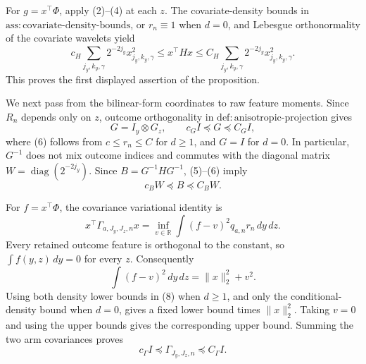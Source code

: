 For \(g=x^{\top}\Phi\), apply (2)--(4) at each \(z\).  The covariate-density bounds in \(\mathrm{ass{:}covariate\text{-}density\text{-}bounds}\), or \(r_n\equiv1\) when \(d=0\), and Lebesgue orthonormality of the covariate wavelets yield
\[
 c_H\sum_{j_y,k_y,\gamma}2^{-2j_y}x_{j_y,k_y,\gamma}^2
 \leq x^{\top}Hx
 \leq C_H\sum_{j_y,k_y,\gamma}2^{-2j_y}x_{j_y,k_y,\gamma}^2. \tag{5}
\]
This proves the first displayed assertion of the proposition.

We next pass from the bilinear-form coordinates to raw feature moments.  Since \(R_n\) depends only on \(z\), outcome orthogonality in \(\mathrm{def{:}anisotropic\text{-}projection}\) gives
\[
 G=I_y\otimes G_z,
 \qquad c_GI\preceq G\preceq C_GI, \tag{6}
\]
where (6) follows from \(c\leq r_n\leq C\) for \(d\geq1\), and \(G=I\) for \(d=0\).  In particular, \(G^{-1}\) does not mix outcome indices and commutes with the diagonal matrix \(W=\operatorname{diag}(2^{-2j_y})\).  Since \(B=G^{-1}HG^{-1}\), (5)--(6) imply
\[
 c_BW\preceq B\preceq C_BW. \tag{7}
\]

For \(f=x^{\top}\Phi\), the covariance variational identity is
\[
 x^{\top}\Gamma_{a,J_y,J_z,n}x
 =\inf_{v\in\mathbb R}\int(f-v)^2q_{a,n}r_n\,dy\,dz. \tag{8}
\]
Every retained outcome feature is orthogonal to the constant, so \(\int f(y,z)\,dy=0\) for every \(z\).  Consequently
\[
 \int(f-v)^2\,dy\,dz=\|x\|_2^2+v^2.
\]
Using both density lower bounds in (8) when \(d\geq1\), and only the conditional-density bound when \(d=0\), gives a fixed lower bound times \(\|x\|_2^2\).  Taking \(v=0\) and using the upper bounds gives the corresponding upper bound.  Summing the two arm covariances proves
\[
 c_\Gamma I\preceq\Gamma_{J_y,J_z,n}\preceq C_\Gamma I. \tag{9}
\]

